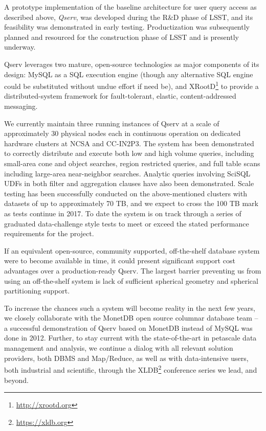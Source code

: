 \documentclass[DM,toc]{lsstdoc}
\begin{document}
A prototype implementation of the baseline architecture for user query access
as described above, \emph{Qserv}, was developed during the R\&D phase of LSST,
and its feasibility was demonstrated in early testing.  Productization was
subsequently planned and resourced for the construction phase of LSST and is
presently underway.

Qserv leverages two mature, open-source technologies as major components of
its design: MySQL as a SQL execution engine (though any alternative SQL engine
could be substituted without undue effort if need be), and
XRootD\footnote{\url{http://xrootd.org}} \citep{Dorigo:2005:XRootd} to provide
a distributed-system framework for fault-tolerant, elastic, content-addressed
messaging.

We currently maintain three running instances of Qserv at a scale of
approximately 30 physical nodes each in continuous operation on dedicated
hardware clusters at NCSA and CC-IN2P3. The system has been demonstrated to
correctly distribute and execute both low and high volume queries, including
small-area cone and object searches, region restricted queries, and full table
scans including large-area near-neighbor searches. Analytic queries involving
SciSQL UDFs in both filter and aggregation clauses have also been
demonstrated. Scale testing has been successfully conducted on the
above-mentioned clusters with datasets of up to approximately 70 TB, and we
expect to cross the 100 TB mark as tests continue in 2017. To date the system
is on track through a series of graduated data-challenge style tests to meet
or exceed the stated performance requirements for the project.

If an equivalent open-source, community supported, off-the-shelf database
system were to become available in time, it could present significant support
cost advantages over a production-ready Qserv. The largest barrier preventing
us from using an off-the-shelf system is lack of sufficient spherical geometry
and spherical partitioning support.

To increase the chances such a system will become reality in the next
few years, we closely collaborate with the MonetDB open
source columnar database team -- a successful demonstration of Qserv
based on MonetDB instead of MySQL was done in 2012. Further, to stay
current with the state-of-the-art in petascale data management and
analysis, we continue a dialog with all relevant solution providers,
both DBMS and Map/Reduce, as well as with data-intensive users, both
industrial and scientific, through the XLDB\footnote{\url{https://xldb.org}}
conference series we lead, and beyond.
\end{document}
